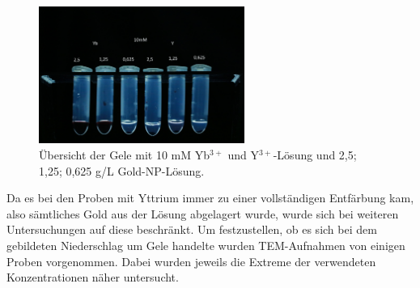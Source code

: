 		\begin{figure}[H]
			\centering
			\includegraphics[width=0.6\textwidth]{Bilder/1Y-Yb-Gele} 	
			\caption{Übersicht der Gele mit 10 mM Yb$^{3+}$ und Y$^{3+}$-Lösung und 2,5; 1,25; 0,625 g/L Gold-NP-Lösung.}
			\label{fig:1Y-Yb-Gele}
		\end{figure}
		
		Da es bei den Proben mit Yttrium immer zu einer vollständigen Entfärbung kam, also sämtliches Gold aus der Lösung abgelagert wurde, wurde sich bei weiteren Untersuchungen auf diese beschränkt.
		Um festzustellen, ob es sich bei dem gebildeten Niederschlag um Gele handelte wurden TEM-Aufnahmen von einigen Proben vorgenommen.
		Dabei wurden jeweils die Extreme der verwendeten Konzentrationen näher untersucht.
		
